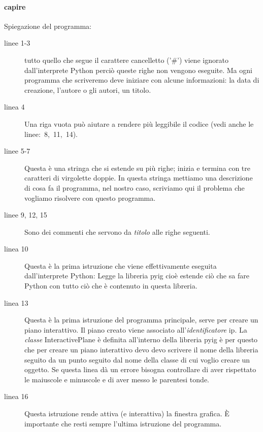 

\paragraph{capire}
Spiegazione del programma:

\begin{description}
 \item [linee 1-3] 
 tutto quello che segue il carattere cancelletto ('\#') viene ignorato 
dall'interprete Python perciò queste righe non vengono eseguite. Ma ogni 
programma che scriveremo deve iniziare con alcune informazioni: 
la data di creazione, l'autore o gli autori, un titolo.
 \item [linea 4]
 Una riga vuota può aiutare a rendere più leggibile il codice (vedi anche le 
linee:~8,~11,~14).
 \item [linee 5-7]
 Questa è una stringa che si estende su più righe; inizia e termina con tre 
caratteri di virgolette doppie. In questa stringa mettiamo una descrizione di 
cosa fa il programma, nel nostro caso, scriviamo qui il problema che vogliamo 
risolvere con questo programma.
 \item [linee 9, 12, 15]
 Sono dei commenti che servono da \emph{titolo} alle righe seguenti.
 \item [linea 10]
 Questa è la prima istruzione che viene effettivamente eseguita 
dall'interprete Python: Legge la libreria {\ttfamily pyig} cioè estende ciò 
che sa fare Python con tutto ciò che è contenuto in questa libreria. 
 \item [linea 13]
 Questa è la prima istruzione del programma principale, serve per creare un 
piano interattivo. Il piano creato viene associato all'\emph{identificatore}
{\ttfamily ip}. La \emph{classe} {\ttfamily InteractivePlane} è definita 
all'interno della libreria {\ttfamily pyig} è per questo che per creare un 
piano interattivo devo devo scrivere il nome della libreria seguito da un punto 
seguito dal nome della classe di cui voglio creare un oggetto. Se 
questa linea dà un errore bisogna controllare di aver rispettato le maiuscole e 
minuscole e di aver messo le parentesi tonde. 
 \item [linea 16]
 Questa istruzione rende attiva (e interattiva) la finestra grafica. È 
importante che resti sempre l'ultima istruzione del programma.
\end{description}

